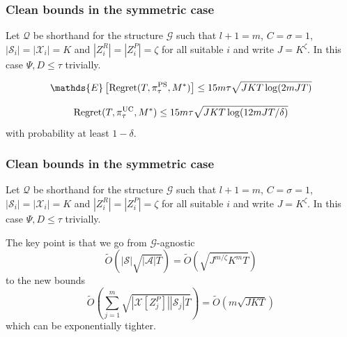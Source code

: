 \documentclass{beamer}
\newcommand{\Exp}{\mathds{E}}
\newcommand{\Xc}{\mathcal{X}}
\newcommand{\Qc}{\mathcal{Q}}
\newcommand{\Gc}{\mathcal{G}}
\newcommand{\Sc}{\mathcal{S}}
\newcommand{\Ac}{\mathcal{A}}
\begin{document}
\begin{frame}
\frametitle{Clean bounds in the symmetric case}
Let $\Qc$ be shorthand for the structure $\Gc$ such that $l+1=m$, $C=\sigma=1$, $| \Sc_i | = |\Xc_i | = K$ and $|Z^R_i| = |Z^P_i | = \zeta$ for all suitable $i$ and write $J = K^\zeta$.
In this case $\Psi, D \le \tau$ trivially.
\vspace{2mm}

\begin{corollary}
\label{cor: reg PSRL}
\begin{equation}
	\Exp \left[\mathrm{Regret}(T, \pi^{\rm PS}_{\tau}, M^*) \right]
	\le 15m \tau \sqrt{J K T \log(2mJ T)}
\end{equation}
\end{corollary}

\begin{corollary}
\label{cor: reg UCRL-Factored}
\begin{equation}
	\mathrm{Regret}(T, \pi^{\rm UC}_{\tau}, M^*) \le  15m \tau \sqrt{J K T \log(12mJT / \delta)}
\end{equation}
with probability at least $1-\delta$.
\end{corollary}
\end{frame}

\begin{frame}
\frametitle{Clean bounds in the symmetric case}
Let $\Qc$ be shorthand for the structure $\Gc$ such that $l+1=m$, $C=\sigma=1$, $| \Sc_i | = |\Xc_i | = K$ and $|Z^R_i| = |Z^P_i | = \zeta$ for all suitable $i$ and write $J = K^\zeta$.
In this case $\Psi, D \le \tau$ trivially.
\vspace{7mm}

The key point is that we go from $\Gc$-agnostic
$$ \tilde{O}(|\Sc| \sqrt{|\Ac|T}) = \tilde{O}(\sqrt{J^{m/\zeta} K^{m} T})$$
to the new bounds
$$ \tilde{O}(\sum_{j=1}^{m}\sqrt{|\Xc[Z^P_j]||\Sc_j|T}) = \tilde{O}(m \sqrt{J K T})$$
which can be exponentially tighter.
\end{frame}
\end{document}
